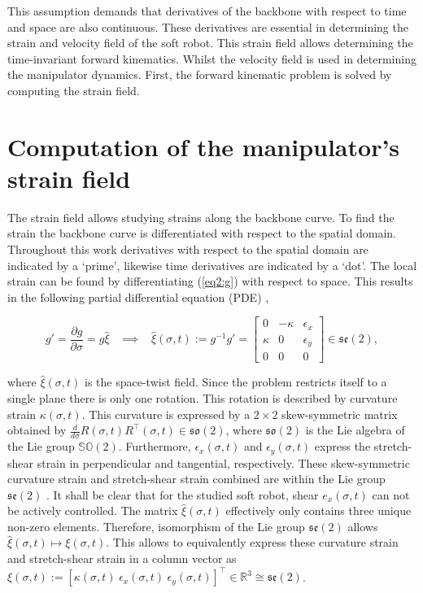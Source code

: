 This assumption demands that derivatives of the backbone with respect to time and space are also continuous. These derivatives are essential in determining the strain and velocity field of the soft robot. This strain field allows determining the time-invariant forward kinematics. Whilst the velocity field is used in determining the manipulator dynamics. First, the forward kinematic problem is solved by computing the strain field.



\section{Computation of the manipulator's strain field}

The strain field allows studying strains along the backbone curve. To find the strain the backbone curve is differentiated with respect to the spatial domain. Throughout this work derivatives with respect to the spatial domain are indicated by a `prime', likewise time derivatives are indicated by a `dot'. The local strain can be found by differentiating (\ref{eq2:g}) with respect to space. This results in the following partial differential equation (PDE) \cite{Caasenbrood2020}, 

\begin{equation}
   g' = \frac{\partial g}{\partial \sigma} = g \hat{\xi} \hspace{10pt} \implies \hspace{10pt}  \hat{\xi}(\sigma,t) := g^{-1}g' = \begin{bmatrix} 0 & -\kappa & \epsilon_x  \\ \kappa & 0 & \epsilon_y \\ 0 & 0 & 0 \end{bmatrix} \in  \mathfrak{se}(2),
    \label{eq2:dgdsigma}
\end{equation}

where $\hat{\xi}(\sigma,t)$ is the space-twist field. Since the problem restricts itself to a single plane there is only one rotation. This rotation is described by curvature strain $\kappa(\sigma,t)$. This curvature is expressed by a $2 \times 2$ skew-symmetric matrix obtained by $\frac{d}{d\sigma}R(\sigma,t)R^\top(\sigma,t) \in \mathfrak{so}(2)$, where $\mathfrak{so}(2)$ is the Lie algebra of the Lie group $\mathbb{SO}(2)$. Furthermore, $\epsilon_x(\sigma,t)$ and $\epsilon_y(\sigma,t)$ express the stretch-shear strain in perpendicular and tangential, respectively. These skew-symmetric curvature strain and stretch-shear strain combined are within the Lie group $\mathfrak{se}(2)$ \cite{Sola2018}. It shall be clear that for the studied soft robot, shear $e_x(\sigma,t)$ can not be actively controlled. The matrix $\hat{\xi}(\sigma,t)$ effectively only contains three unique non-zero elements. Therefore, isomorphism of the Lie group $\mathfrak{se}(2)$ allows $\hat{\xi}(\sigma,t) \longmapsto \xi(\sigma,t)$. This allows to equivalently express these curvature strain and stretch-shear strain in a column vector as $\xi(\sigma,t):= [\kappa(\sigma,t) \hspace{3pt} \epsilon_x(\sigma,t) \hspace{3pt} \epsilon_y(\sigma,t) ]^\top \in \mathbb{R}^3 \cong \mathfrak{se}(2)$.


